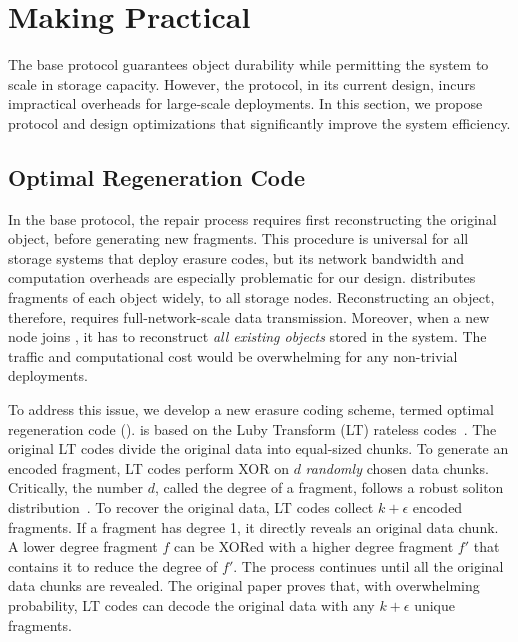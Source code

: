 
\section{Making \sys Practical}
\label{sec:optz}

The base \sys protocol guarantees object durability while permitting the system to scale in storage capacity.
However, the protocol, in its current design, incurs impractical overheads for large-scale deployments.
In this section, we propose protocol and design optimizations that significantly improve the system efficiency.

\subsection{Optimal Regeneration Code}
\label{sec:optz:orc}
In the base \sys protocol, the repair process requires first reconstructing the original object, before generating new fragments.
This procedure is universal for all storage systems that deploy erasure codes, but its network bandwidth and computation overheads are especially problematic for our \sys design.
\sys distributes fragments of each object widely, to all storage nodes.
Reconstructing an object, therefore, requires full-network-scale data transmission.
Moreover, when a new node joins \sys, it has to reconstruct \emph{all existing objects} stored in the system.
The traffic and computational cost would be overwhelming for any non-trivial deployments.

To address this issue, we develop a new erasure coding scheme, termed optimal regeneration code (\code).
\code is based on the Luby Transform (LT) rateless codes~\cite{ltcodes}.
The original LT codes divide the original data into equal-sized chunks.
To generate an encoded fragment, LT codes perform XOR on $d$ \emph{randomly} chosen data chunks.
Critically, the number $d$, called the degree of a fragment, follows a robust soliton distribution~\cite{ltcodes}.
To recover the original data, LT codes collect $k + \epsilon$ encoded fragments.
If a fragment has degree 1, it directly reveals an original data chunk.
A lower degree fragment $f$ can be XORed with a higher degree fragment $f'$ that contains it to reduce the degree of $f'$.
The process continues until all the original data chunks are revealed.
The original paper proves that, with overwhelming probability, LT codes can decode the original data with any $k + \epsilon$ unique fragments.

